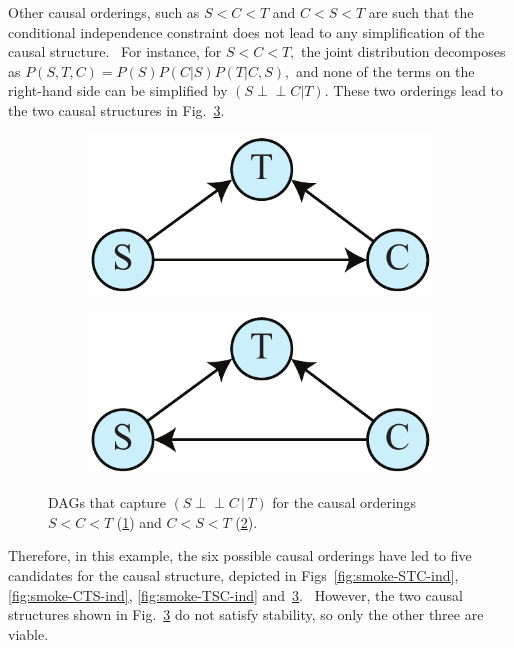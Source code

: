 \documentclass[letterpaper,onecolumn,nofootinbib]{revtex4}
\def\indep{\perp\!\!\!\!\perp}
\begin{document}
Other causal orderings, such as $S<C<T$ and $C<S<T$ are such that the
conditional independence constraint does not lead to any simplification of
the causal structure. \ For instance, for $S<C<T,$ the joint distribution
decomposes as $P(S,T,C)=P(S)P(C|S)P(T|C,S),$ and none of the terms on the
right-hand side can be simplified by $(S\indep C|T).$  These two orderings lead to the two causal structures in Fig.~\ref{fig:smoke-SCT-CST}.
\begin{figure}[h]
        \begin{subfigure}[b]{0.2\textwidth}
                	\centering
                	\includegraphics[width=\textwidth]{smoke-SCT}
		\caption{}
                	\label{fig:smoke-SCT}
	\end{subfigure}
        \quad
        \begin{subfigure}[b]{0.2\textwidth}
                	\centering
                	\includegraphics[width=\textwidth]{smoke-CST}
            	\caption{}
                	\label{fig:smoke-CST}
        \end{subfigure}
        \caption{DAGs that capture $(S\indep C\,|\, T)$ for the causal orderings $S<C<T$ (\ref{fig:smoke-SCT}) and $C<S<T$ (\ref{fig:smoke-CST}).}
        \label{fig:smoke-SCT-CST}
\end{figure}

Therefore, in this example, the six possible causal orderings have led to five candidates for the causal structure, depicted in Figs~\ref{fig:smoke-STC-ind}, \ref{fig:smoke-CTS-ind}, \ref{fig:smoke-TSC-ind} and~\ref{fig:smoke-SCT-CST}. \ However, the two causal structures shown in Fig.~\ref{fig:smoke-SCT-CST} do not satisfy stability, so only the other three are viable.
\end{document}
